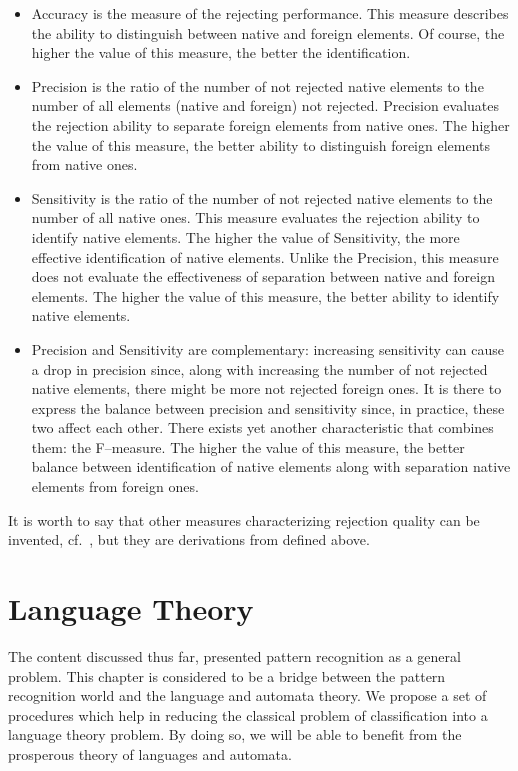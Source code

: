 \documentclass{mini}
\begin{document}
\begin{itemize}
  \item Accuracy is the measure of the rejecting performance. This measure describes the ability to distinguish between native and foreign elements. Of course, the higher the value of this measure, the better the identification.
  \item Precision is the ratio of the number of not rejected native elements to the number of all elements (native and foreign) not rejected. Precision evaluates the rejection ability to separate foreign elements from native ones. The higher the value of this measure, the better ability to distinguish foreign elements from native ones.
  \item Sensitivity is the ratio of the number of not rejected native elements to the number of all native ones. This measure evaluates the rejection ability to identify native elements. The higher the value of Sensitivity, the more effective identification of native elements. Unlike the Precision, this measure does not evaluate the effectiveness of separation between native and foreign elements. The higher the value of this measure, the better ability to identify native elements.
  \item Precision and Sensitivity are complementary: increasing sensitivity can cause a drop in precision since, along with increasing the number of not rejected native elements, there might be more not rejected foreign ones. It is there to express the balance between precision and sensitivity since, in practice, these two affect each other. There exists yet another characteristic that combines them: the \mbox{F--measure}. The higher the value of this measure, the better balance between identification of native elements along with separation native elements from foreign ones.
\end{itemize}
It is worth to say that other measures characterizing rejection quality can be invented, cf.~\cite{Homenda_2014}, but they are derivations from defined above.  

\chapter{Language Theory} \label{chap:lan_theory}

The content discussed thus far, presented pattern recognition as a general problem. This chapter is considered to be a bridge between the pattern recognition world and the language and automata theory. We propose a set of procedures which help in reducing the classical problem of classification into a language theory problem. By doing so, we will be able to benefit from the prosperous theory of languages and automata.
\end{document}
